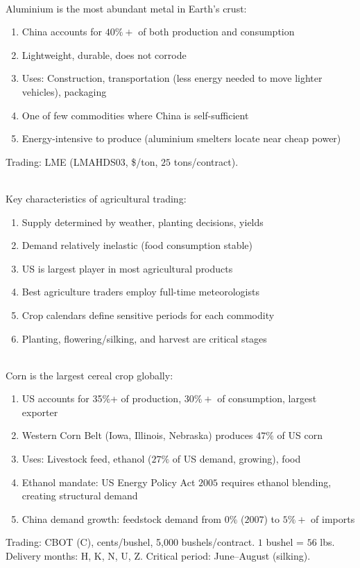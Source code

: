 \documentclass[a4paper,oneside,openany]{book}
\begin{document}
\begin{remark} \\
Aluminium is the most abundant metal in Earth's crust:
\begin{enumerate}[label=\roman*.]
\setlength{\itemsep}{0pt}
\item China accounts for $40\%+$ of both production and consumption
\item Lightweight, durable, does not corrode
\item Uses: Construction, transportation (less energy needed to move lighter vehicles), packaging
\item One of few commodities where China is self-sufficient
\item Energy-intensive to produce (aluminium smelters locate near cheap power)
\end{enumerate}
Trading: LME (LMAHDS03, \$/ton, $25$ tons/contract).
\end{remark}

\begin{remark} \\
Key characteristics of agricultural trading:
\begin{enumerate}[label=\roman*.]
\setlength{\itemsep}{0pt}
\item Supply determined by weather, planting decisions, yields
\item Demand relatively inelastic (food consumption stable)
\item US is largest player in most agricultural products
\item Best agriculture traders employ full-time meteorologists
\item Crop calendars define sensitive periods for each commodity
\item Planting, flowering/silking, and harvest are critical stages
\end{enumerate}
\end{remark}

\begin{remark} \\
Corn is the largest cereal crop globally:
\begin{enumerate}[label=\roman*.]
\setlength{\itemsep}{0pt}
\item US accounts for 35\%+ of production, $30\%+$ of consumption, largest exporter
\item Western Corn Belt (Iowa, Illinois, Nebraska) produces $47\%$ of US corn
\item Uses: Livestock feed, ethanol ($27\%$ of US demand, growing), food
\item Ethanol mandate: US Energy Policy Act $2005$ requires ethanol blending, creating structural demand
\item China demand growth: feedstock demand from $0\%$ ($2007$) to $5\%+$ of imports
\end{enumerate}
Trading: CBOT (C), cents/bushel, 5,000 bushels/contract. $1$ bushel = $56$ lbs.\\
Delivery months: H, K, N, U, Z. Critical period: June--August (silking).
\end{remark}
\end{document}
